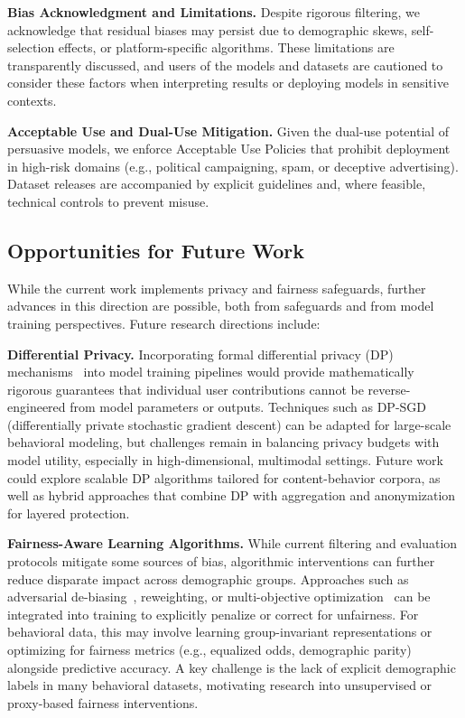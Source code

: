 \textbf{Bias Acknowledgment and Limitations.}
Despite rigorous filtering, we acknowledge that residual biases may persist due to demographic skews, self-selection effects, or platform-specific algorithms. These limitations are transparently discussed, and users of the models and datasets are cautioned to consider these factors when interpreting results or deploying models in sensitive contexts.


\textbf{Acceptable Use and Dual-Use Mitigation.}
Given the dual-use potential of persuasive models, we enforce Acceptable Use Policies that prohibit deployment in high-risk domains (e.g., political campaigning, spam, or deceptive advertising). Dataset releases are accompanied by explicit guidelines and, where feasible, technical controls to prevent misuse.


\subsection{Opportunities for Future Work}
While the current work implements privacy and fairness safeguards, further advances in this direction are possible, both from safeguards and from model training perspectives. Future research directions include:

\textbf{Differential Privacy.} Incorporating formal differential privacy (DP) mechanisms~\cite{dwork2014algorithmic} into model training pipelines would provide mathematically rigorous guarantees that individual user contributions cannot be reverse-engineered from model parameters or outputs. Techniques such as DP-SGD (differentially private stochastic gradient descent) can be adapted for large-scale behavioral modeling, but challenges remain in balancing privacy budgets with model utility, especially in high-dimensional, multimodal settings. Future work could explore scalable DP algorithms tailored for content-behavior corpora, as well as hybrid approaches that combine DP with aggregation and anonymization for layered protection.

\textbf{Fairness-Aware Learning Algorithms.} While current filtering and evaluation protocols mitigate some sources of bias, algorithmic interventions can further reduce disparate impact across demographic groups. Approaches such as adversarial de-biasing~\cite{zhang2018mitigating}, reweighting, or multi-objective optimization~\cite{hardt2016equality} can be integrated into training to explicitly penalize or correct for unfairness. For behavioral data, this may involve learning group-invariant representations or optimizing for fairness metrics (e.g., equalized odds, demographic parity) alongside predictive accuracy. A key challenge is the lack of explicit demographic labels in many behavioral datasets, motivating research into unsupervised or proxy-based fairness interventions.

